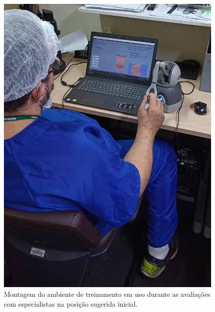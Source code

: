 \begin{figure}[ht!]
    \centering
    \includegraphics[width=0.4\linewidth]{capitulos/figuras/montagem-teste-especialistas-1.jpg} 
    \caption{Montagem do ambiente de treinamento em uso durante as avaliações com especialistas na posição sugerida inicial.}
    \label{fig:montagemTesteEspecialistasInicial}
\end{figure}

